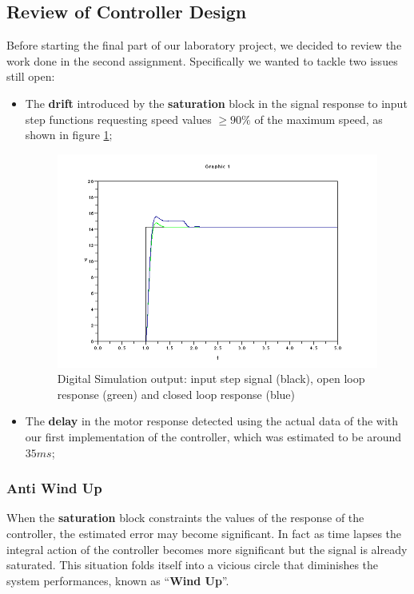 \subsection{Review of \LEGOMOTOR{} Controller Design}

Before starting the final part of our laboratory project, we decided to review the work done in the second assignment. Specifically we wanted to tackle two issues still open:
\begin{itemize}
\item The \textbf{drift} introduced by the \textbf{saturation} block in the signal response to input step functions requesting speed values $\geq{}90\%$ of the maximum speed, as shown in figure \ref{fig:sim_noAW_noSP};

\begin{figure}[H]
\center
  \includegraphics[scale=0.51]{FIGURES_3/Simulation_noAW_noSP.png}
  \caption[SOSModel]{Digital Simulation output: input step signal (black), open loop response (green) and closed loop response (blue)}
  \label{fig:sim_noAW_noSP}
\end{figure}

\item The \textbf{delay} in the motor response detected using the actual data of the \LEGOMOTOR{} with our first implementation of the controller, which was estimated to be around $35ms$;
\end{itemize}

\subsubsection{Anti Wind Up}

When the \textbf{saturation} block constraints the values of the response of the controller, the estimated error may become significant. In fact as time lapses the integral action of the controller becomes more significant but the signal is already saturated. This situation folds itself into a vicious circle that diminishes the system performances, known as ``\textbf{Wind Up}''. 

